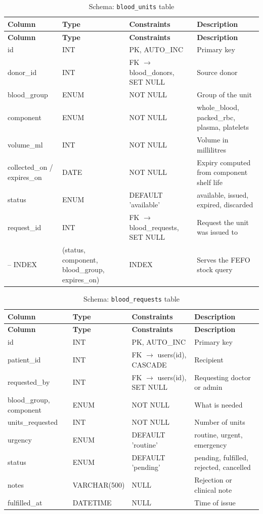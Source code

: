 \begin{longtable}{|L{3.3cm}|L{2.5cm}|L{2.4cm}|L{4.6cm}|}
\caption{Schema: \texttt{blood\_units} table} \label{tab:units} \\
\hline
\textbf{Column} & \textbf{Type} & \textbf{Constraints} & \textbf{Description} \\
\hline
\endfirsthead
\hline
\textbf{Column} & \textbf{Type} & \textbf{Constraints} & \textbf{Description} \\
\hline
\endhead
\hline
\endfoot
id & INT & PK, AUTO\_INC & Primary key \\
\hline
donor\_id & INT & FK $\rightarrow$ blood\_donors, SET NULL & Source donor \\
\hline
blood\_group & ENUM & NOT NULL & Group of the unit \\
\hline
component & ENUM & NOT NULL & whole\_blood, packed\_rbc, plasma, platelets \\
\hline
volume\_ml & INT & NOT NULL & Volume in millilitres \\
\hline
collected\_on / expires\_on & DATE & NOT NULL & Expiry computed from component shelf life \\
\hline
status & ENUM & DEFAULT 'available' & available, issued, expired, discarded \\
\hline
request\_id & INT & FK $\rightarrow$ blood\_requests, SET NULL & Request the unit was issued to \\
\hline
-- INDEX & (status, component, blood\_group, expires\_on) & INDEX & Serves the FEFO stock query \\
\hline
\end{longtable}
\begin{longtable}{|L{3.3cm}|L{2.5cm}|L{2.4cm}|L{4.6cm}|}
\caption{Schema: \texttt{blood\_requests} table} \label{tab:bloodreq} \\
\hline
\textbf{Column} & \textbf{Type} & \textbf{Constraints} & \textbf{Description} \\
\hline
\endfirsthead
\hline
\textbf{Column} & \textbf{Type} & \textbf{Constraints} & \textbf{Description} \\
\hline
\endhead
\hline
\endfoot
id & INT & PK, AUTO\_INC & Primary key \\
\hline
patient\_id & INT & FK $\rightarrow$ users(id), CASCADE & Recipient \\
\hline
requested\_by & INT & FK $\rightarrow$ users(id), SET NULL & Requesting doctor or admin \\
\hline
blood\_group, component & ENUM & NOT NULL & What is needed \\
\hline
units\_requested & INT & NOT NULL & Number of units \\
\hline
urgency & ENUM & DEFAULT 'routine' & routine, urgent, emergency \\
\hline
status & ENUM & DEFAULT 'pending' & pending, fulfilled, rejected, cancelled \\
\hline
notes & VARCHAR(500) & NULL & Rejection or clinical note \\
\hline
fulfilled\_at & DATETIME & NULL & Time of issue \\
\hline
\end{longtable}
